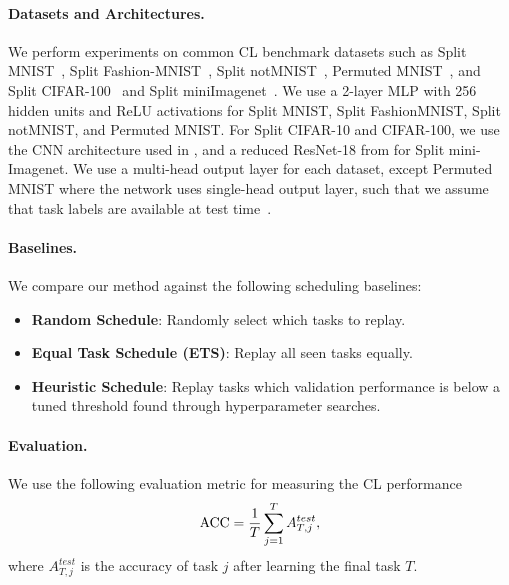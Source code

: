 \vspace{-3mm}
\paragraph{Datasets and Architectures.} We perform experiments on common CL benchmark datasets such as Split MNIST~\cite{zenke2017continual}, Split Fashion-MNIST~\cite{xiao2017fashion}, Split notMNIST~\cite{bulatov2011notMNIST}, Permuted MNIST~\cite{goodfellow2013empirical}, and Split CIFAR-100~\cite{krizhevsky2009learning, lopez2017gradient, rebuffi2017icarl} and Split miniImagenet~\cite{vinyals2016matching}. We use a 2-layer MLP with 256 hidden units and ReLU activations for Split MNIST, Split FashionMNIST, Split notMNIST, and Permuted MNIST.  For Split CIFAR-10 and CIFAR-100, we use the CNN architecture used in \cite{adel2019continual, schwarz2018progress, vinyals2016matching}, and a reduced ResNet-18 from \cite{lopez2017gradient} for Split mini-Imagenet. We use a multi-head output layer for each dataset, except Permuted MNIST where the network uses single-head output layer, such that we assume that task labels are available at test time~\cite{van2019three}. 

\vspace{-3mm}
\paragraph{Baselines.} We compare our method against the following scheduling baselines:
\begin{itemize}[itemsep=0em,topsep=1pt]
	\item {\bf Random Schedule}: Randomly select which tasks to replay.
	\item {\bf Equal Task Schedule (ETS)}: Replay all seen tasks equally.
	\item {\bf Heuristic Schedule}: Replay tasks which validation performance is below a tuned threshold found through hyperparameter searches.
\end{itemize} 

\vspace{-3mm}
\paragraph{Evaluation.} We use the following evaluation metric for measuring the CL performance
\begin{align}\label{eq:acc}
	{\text{ACC}} = \frac{1}{T} \sum_{j=1}^{T} A_{T, j}^{test},
\end{align}
where $A_{T, j}^{test}$ is the accuracy of task $j$ after learning the final task $T$.  

